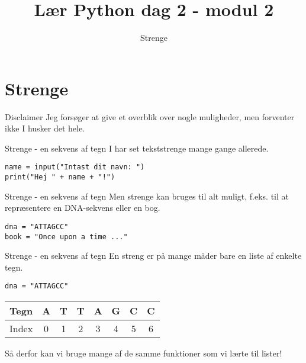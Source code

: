 \documentclass[main.tex]{subfiles}
\title{Lær Python dag 2 - modul 2}
\subtitle{Strenge}
\begin{document}
\maketitle


\section{Strenge}
\begin{frame}[fragile]{Disclaimer}
Jeg forsøger at give et overblik over nogle muligheder, men forventer ikke I husker det hele.

\end{frame}


\begin{frame}[fragile]{Strenge - en sekvens af tegn}
	I har set tekststrenge mange gange allerede.
	\begin{lstlisting}[style=python]
name = input("Intast dit navn: ")
print("Hej " + name + "!")
	\end{lstlisting}
\end{frame}

\begin{frame}[fragile]{Strenge - en sekvens af tegn}
	Men strenge kan bruges til alt muligt, f.eks. til at repræsentere en DNA-sekvens eller en bog.
	\begin{lstlisting}[style=python]
dna = "ATTAGCC"
book = "Once upon a time ..."
	\end{lstlisting}
\end{frame}

\begin{frame}[fragile]{Strenge - en sekvens af tegn}
	En streng er på mange måder bare en liste af enkelte tegn.
	\begin{lstlisting}[style=python]
dna = "ATTAGCC"
	\end{lstlisting}
	\begin{tabular}{|l|c|c|c|c|c|c|c|}
		\hline
		Tegn 	& A & T & T & A & G & C & C \\
		\hline
		Index 	& 0 & 1 & 2 & 3 & 4 & 5 & 6 \\
		\hline
	\end{tabular}
\pause

Så derfor kan vi bruge mange af de samme funktioner som vi lærte til lister!
\end{frame}
\end{document}
